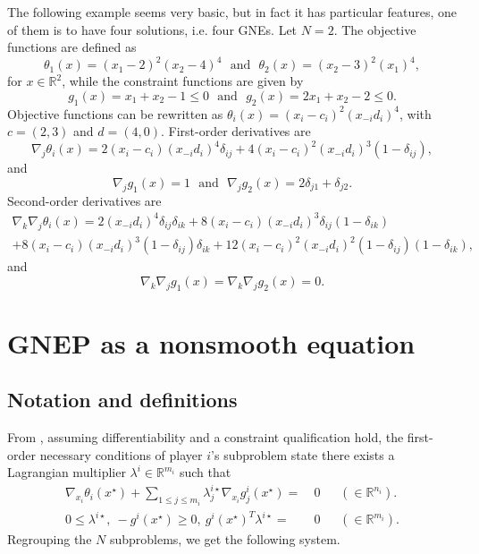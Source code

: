 \documentclass[11pt, a4paper]{article}
\newcommand{\txtm}[1]{\textrm{~~#1~~}}
\newcommand{\R}{\ensuremath{\mathbb{R}}}
\begin{document}
The following example seems very basic, but in fact it has particular features, one of them is to have four solutions, i.e. four GNEs.
Let $N=2$. The objective functions are defined as
$$
\theta_1(x) = (x_1-2)^2 (x_2-4)^4 \txtm{and} \theta_2(x) = (x_2-3)^2 (x_1)^4,
$$
for $x\in \R^2$, while the constraint functions are given by
$$
g_1(x) = x_1+x_2-1 \leq 0 \txtm{and} g_2(x) = 2x_1+x_2-2 \leq 0.
$$
Objective functions can be rewritten as $\theta_i(x) = (x_i - c_i)^2 (x_{-i} d_i)^4$, with $c = (2, 3)$ and
$d=(4,0)$.
First-order derivatives are 
$$
\nabla_j \theta_i(x) = 2 (x_i - c_i) (x_{-i} d_i)^4 \delta_{ij} +  4(x_i - c_i)^2 (x_{-i} d_i)^3 (1- \delta_{ij}),
$$
and
$$
\nabla_j g_1(x) = 1
\txtm{and}
\nabla_j g_2(x) = 2 \delta_{j1} + \delta_{j2}.
$$
Second-order derivatives are
\begin{equation*}
\begin{split}
\nabla_k \nabla_j \theta_i(x) = 2 (x_{-i} d_i)^4 \delta_{ij} \delta_{ik}  
+ 8 (x_i - c_i) (x_{-i} d_i)^3 \delta_{ij} (1-\delta_{ik}) \\
+ 8(x_i - c_i) (x_{-i} d_i)^3 (1- \delta_{ij})  \delta_{ik} 
+ 12(x_i - c_i)^2 (x_{-i} d_i)^2 (1- \delta_{ij})(1- \delta_{ik} ),
\end{split}
\end{equation*}
and
$$
\nabla_k \nabla_j g_1(x) =  \nabla_k \nabla_j g_2(x) = 0.
$$


\section{GNEP as a nonsmooth equation}


\subsection{Notation and definitions}



From \cite{facchfischpic09}, 
assuming differentiability and a constraint qualification hold, the first-order necessary conditions of player $i$'s subproblem state there exists a Lagrangian multiplier
 $\lambda^i \in  \R^{m_i} $ such that 
\begin{equation*}
\begin{split}
\nabla_{x_i} \theta_{i}(x^\star)   + \sum_{ 1 \leq j \leq m_i } \lambda_{j}^{i\star} \nabla_{x_i} g_{j}^i(x^\star) = &~0~~~~~~~ ( \in \R^{n_i} ). \\
0 \leq \lambda^{i\star},~  - g^i(x^\star) \geq 0,~  g^i(x^\star)^T\lambda^{i\star}= & ~0~~~~~~~ ( \in \R^{m_i} ) .
\end{split}
\end{equation*}
Regrouping the $N$ subproblems, we get the following system.
\end{document}
